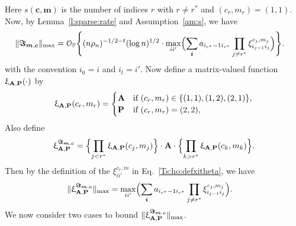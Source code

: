 \documentclass[10pt,journal,compsoc]{IEEEtran}
\newcommand{\op}{\mathcal{O}_{\mathbb{P}}}
\newcommand{\ee}{\end{aligned} \end{equation}}
\newcommand{\bds}{\boldsymbol}
\newcommand {\ba}{{\bm{c}}}
\newcommand{\bee}{\begin{equation}\begin{aligned}}
\newcommand{\M}[1]{{{\mathbf{\MakeUppercase{#1}}}}}
\numberwithin{equation}{section}
\begin{document}
Here $s(\bds{c}, \bds{m})$ is the number of indices $r$ with $r
\not = r^*$ and $(c_r, m_r) = (1,1)$. 
Now, by Lemma~\ref{l:sparse:rate} and Assumption~\ref{am:s}, we have
\bee\label{Ts:ho:mainIm}
\|\bds{\Im}_{\bds{m},\bds{c}}\|_{\max} 
&= \op\Bigg\{(n\rho_n)^{-1/2
  -t}(\log n)^{1/2} \cdot \max_{ii'}  \Bigl(\sum_{\bds{i}} a_{i_{r^*} - 1i_{r^*}} \prod_{j \not =
  r^*} \xi^{c_j,m_j}_{i_{j-1}i_j}\Big) \Bigg\}.
\ee
with the convention $i_0 = i$ and $i_{t} = i'$. 
Now define a matrix-valued function $\upxi_{\M A, \M P}(\cdot)$ by
\bee\nonumber
\upxi_{\M A, \M P}(c_r, m_r)=\begin{cases}
\M A & \text{if $(c_r, m_r) \in \{(1,1),(1,2),(2,1)\}$}, \\
\M P & \text{if $(c_r, m_r) = (2,2)$},
\end{cases}
\ee
Also define
\bee\nonumber
\upxi_{\M A,\M P}^{\bds{\Im}_{\bds{m},\bds{c}}} = \Bigl\{\prod_{j < r^*} \upxi_{\M A,\M
  P}(c_j, m_j)\Bigr\} \cdot \M A \cdot \Bigl\{\prod_{k > r^*}
\upxi_{\M A,\M P}(c_k, m_k)\Bigr\}.
\ee 
Then by the definition of the $\xi^{c_r,m}_{ii'}$ in
Eq.~\eqref{Ts:ho:defxitheta}, we have 
\bee
&\|\upxi_{\M A,\M P}^{\bds{\Im}_{\bds{m},\bds{c}}}\|_{\max} 
= \max_{ii'} \Bigl(\sum_{\bds{i}} a_{i_{r^*} - 1i_{r^*}}
  \prod_{j \not = r^*} \xi^{c_j,m_j}_{i_{j-1}i_j} \Bigr).
\ee
We now consider two cases to bound $\|\upxi_{\M A,\M P}^{\bds{\Im}_{\bds{m},\bds{c}}}\|_{\max}$.
\end{document}
